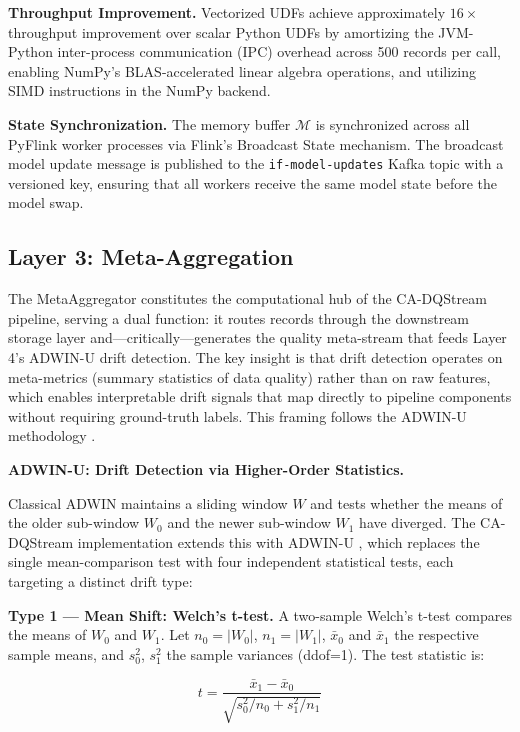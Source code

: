 \textbf{Throughput Improvement.} Vectorized UDFs achieve approximately $16\times$ throughput improvement over scalar Python UDFs by amortizing the JVM-Python inter-process communication (IPC) overhead across 500 records per call, enabling NumPy's BLAS-accelerated linear algebra operations, and utilizing SIMD instructions in the NumPy backend.

\textbf{State Synchronization.} The memory buffer $\mathcal{M}$ is synchronized across all PyFlink worker processes via Flink's Broadcast State mechanism. The broadcast model update message is published to the \texttt{if-model-updates} Kafka topic with a versioned key, ensuring that all workers receive the same model state before the model swap.

\subsection{Layer 3: Meta-Aggregation}

The MetaAggregator constitutes the computational hub of the CA-DQStream pipeline, serving a dual function: it routes records through the downstream storage layer and---critically---generates the quality meta-stream that feeds Layer 4's ADWIN-U drift detection. The key insight is that drift detection operates on meta-metrics (summary statistics of data quality) rather than on raw features, which enables interpretable drift signals that map directly to pipeline components without requiring ground-truth labels. This framing follows the ADWIN-U methodology \citep{adwin2025}.

\bigskip
\noindent\textbf{ADWIN-U: Drift Detection via Higher-Order Statistics.}

Classical ADWIN \citep{bifet2007learning} maintains a sliding window $W$ and tests whether the means of the older sub-window $W_0$ and the newer sub-window $W_1$ have diverged. The CA-DQStream implementation extends this with ADWIN-U \citep{adwin2025}, which replaces the single mean-comparison test with four independent statistical tests, each targeting a distinct drift type:

\bigskip
\noindent\textbf{Type 1 --- Mean Shift: Welch's t-test.} A two-sample Welch's t-test compares the means of $W_0$ and $W_1$. Let $n_0 = |W_0|$, $n_1 = |W_1|$, $\bar{x}_0$ and $\bar{x}_1$ the respective sample means, and $s_0^2$, $s_1^2$ the sample variances (ddof=1). The test statistic is:

\begin{equation}
t = \frac{\bar{x}_1 - \bar{x}_0}{\sqrt{s_0^2 / n_0 + s_1^2 / n_1}}
\label{eq:welch_t_test}
\end{equation}

